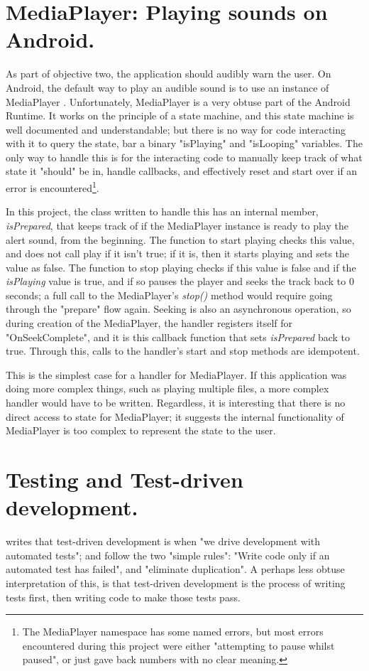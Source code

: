 \documentclass[11pt, a4paper, notitlepage]{report}
\begin{document}
\section{MediaPlayer: Playing sounds on Android.}
As part of objective two, the application should audibly warn the user. On Android, the default way to play an audible sound is to use an instance of MediaPlayer \citep{mediaPlayerAndroid}. Unfortunately, MediaPlayer is a very obtuse part of the Android Runtime. It works on the principle of a state machine, and this state machine is well documented and understandable; but there is no way for code interacting with it to query the state, bar a binary "isPlaying" and "isLooping" variables. The only way to handle this is for the interacting code to manually keep track of what state it "should" be in, handle callbacks, and effectively reset and start over if an error is encountered\footnote{The MediaPlayer namespace has some named errors, but most errors encountered during this project were either "attempting to pause whilst paused", or just gave back numbers with no clear meaning.}.

In this project, the class written to handle this has an internal member, \textit{isPrepared}, that keeps track of if the MediaPlayer instance is ready to play the alert sound, from the beginning. The function to start playing checks this value, and does not call play if it isn't true; if it is, then it starts playing and sets the value as false. The function to stop playing checks if this value is false and if the \textit{isPlaying} value is true, and if so pauses the player and seeks the track back to 0 seconds; a full call to the MediaPlayer's \textit{stop()} method would require going through the "prepare" flow again. Seeking is also an asynchronous operation, so during creation of the MediaPlayer, the handler registers itself for "OnSeekComplete", and it is this callback function that sets \textit{isPrepared} back to true. Through this, calls to the handler's start and stop methods are idempotent.

This is the simplest case for a handler for MediaPlayer. If this application was doing more complex things, such as playing multiple files, a more complex handler would have to be written. Regardless, it is interesting that there is no direct access to state for MediaPlayer; it suggests the internal functionality of MediaPlayer is too complex to represent the state to the user.

\section{Testing and Test-driven development.}\label{sec:TDD}
\citet{tddByExample} writes that test-driven development is when "we drive development with automated tests"; and follow the two "simple rules": "Write code only if an automated test has failed", and "eliminate duplication". A perhaps less obtuse interpretation of this, is that test-driven development is the process of writing tests first, then writing code to make those tests pass.
\end{document}
